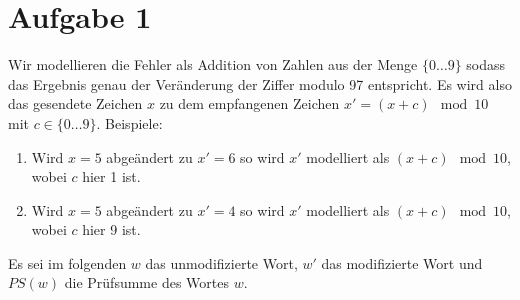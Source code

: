 

\section*{Aufgabe 1}
Wir modellieren die Fehler als Addition von Zahlen aus der Menge $\lbrace 0 \ldots 9\rbrace$ sodass das Ergebnis genau der Veränderung der Ziffer modulo 97 entspricht.
Es wird also das gesendete Zeichen $x$ zu dem empfangenen Zeichen $x' = (x + c) \mod 10$ mit $c\in\lbrace 0 \ldots 9\rbrace$.
Beispiele:
\begin{enumerate}
	\item Wird $x = 5$ abgeändert zu $x' = 6$ so wird $x'$  modelliert als $(x + c) \mod 10$, wobei $c$ hier 1 ist.
	\item Wird $x = 5$ abgeändert zu $x' = 4$ so wird $x'$  modelliert als $(x + c) \mod 10$, wobei $c$ hier 9 ist.
\end{enumerate}

Es sei im folgenden $w$ das unmodifizierte Wort, $w'$ das modifizierte Wort und $PS(w)$ die Prüfsumme des Wortes $w$.

